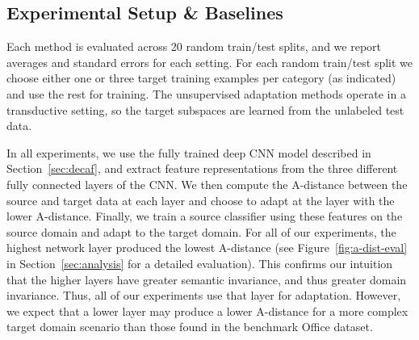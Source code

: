 \subsection{Experimental Setup \& Baselines}

 Each method is evaluated across 20 random train/test splits, and we report averages and standard errors for each setting. 
For each random train/test split we choose either one or three target training examples per category (as indicated) and use the rest for training.  The unsupervised adaptation methods operate in a transductive setting, so the target subspaces are learned from the unlabeled test data.

In all experiments, we use the fully trained deep CNN model described in Section~\ref{sec:decaf}, and extract feature representations from the three different fully connected layers of the CNN. We then compute the A-distance between the source and target data at each layer and choose to adapt at the layer with the lower A-distance. Finally, we train a source classifier using these features on
the source domain and adapt to the target domain. For all of our experiments, the highest network layer produced the lowest A-distance (see Figure~\ref{fig:a-dist-eval} in Section~\ref{sec:analysis} for a detailed evaluation).
This confirms our intuition that the higher layers have greater semantic invariance, and thus greater domain invariance. Thus, all of our experiments use that layer for adaptation.
However, we expect that a lower layer may produce a lower A-distance for a more complex target domain scenario than those found in the benchmark Office dataset.


